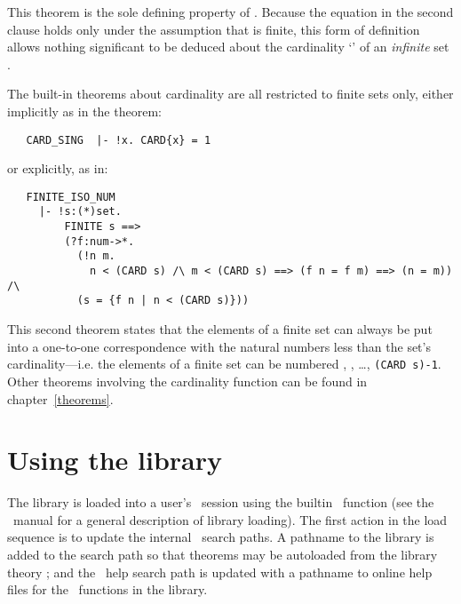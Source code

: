 \noindent This theorem is the sole defining property of .  Because the
equation in the second clause holds only under the assumption that  is
finite, this form of definition allows nothing significant to be deduced about
the cardinality `' of an {\it infinite\/} set .

The built-in theorems about cardinality are all restricted to finite sets only,
either implicitly as in the theorem:

\begin{hol}
\begin{verbatim}
   CARD_SING  |- !x. CARD{x} = 1
\end{verbatim}\end{hol}

\noindent or explicitly, as in:

\begin{hol}
\begin{verbatim}
   FINITE_ISO_NUM
     |- !s:(*)set.
         FINITE s ==>
         (?f:num->*.
           (!n m.
             n < (CARD s) /\ m < (CARD s) ==> (f n = f m) ==> (n = m)) /\
           (s = {f n | n < (CARD s)}))
\end{verbatim}\end{hol}

\noindent This second theorem states that the elements of a finite set can
always be put into a one-to-one correspondence with the natural numbers less
than the set's cardinality---i.e. the elements of a finite set \ml{s} can be
numbered \ml{0}, \ml{1}, \dots, {\small\verb!(CARD s)-1!}.  Other theorems
involving the cardinality function \ml{CARD} can be found in
chapter~\ref{theorems}.

\section{Using the library}\label{using}

The  library is loaded into a user's \HOL\ session using the
builtin \ML\ function \ml{load\_library} (see the \HOL\ manual for a general
description of library loading).  The first action in the load sequence is to
update the internal \HOL\ search paths.  A pathname to the library is added to
the search path so that theorems may be autoloaded from the library theory
\ml{finite\_sets}; and the \HOL\ help search path is updated with a pathname to
online help files for the \ML\ functions in the library.

